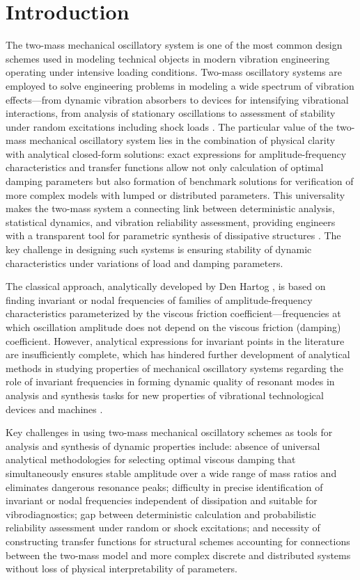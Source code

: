 \documentclass[12pt, a4paper]{article}
\begin{document}
	\section*{Introduction} 
	
	The two-mass mechanical oscillatory system is one of the most common design schemes used in modeling technical objects in modern vibration engineering operating under intensive loading conditions. Two-mass oscillatory systems are employed to solve engineering problems in modeling a wide spectrum of vibration effects---from dynamic vibration absorbers to devices for intensifying vibrational interactions, from analysis of stationary oscillations to assessment of stability under random excitations including shock loads \cite{Lavendel1981, Timoshenko1974}. The particular value of the two-mass mechanical oscillatory system lies in the combination of physical clarity with analytical closed-form solutions: exact expressions for amplitude-frequency characteristics and transfer functions allow not only calculation of optimal damping parameters but also formation of benchmark solutions for verification of more complex models with lumped or distributed parameters. This universality makes the two-mass system a connecting link between deterministic analysis, statistical dynamics, and vibration reliability assessment, providing engineers with a transparent tool for parametric synthesis of dissipative structures \cite{Balakhin2008}. The key challenge in designing such systems is ensuring stability of dynamic characteristics under variations of load and damping parameters.
	
	The classical approach, analytically developed by Den Hartog \cite{DenHartog1956}, is based on finding invariant or nodal frequencies of families of amplitude-frequency characteristics parameterized by the viscous friction coefficient---frequencies at which oscillation amplitude does not depend on the viscous friction (damping) coefficient. However, analytical expressions for invariant points in the literature are insufficiently complete, which has hindered further development of analytical methods in studying properties of mechanical oscillatory systems regarding the role of invariant frequencies in forming dynamic quality of resonant modes in analysis and synthesis tasks for new properties of vibrational technological devices and machines \cite{Kryukov1967, Panovko2020}. 
	
	Key challenges in using two-mass mechanical oscillatory schemes as tools for analysis and synthesis of dynamic properties include: absence of universal analytical methodologies for selecting optimal viscous damping that simultaneously ensures stable amplitude over a wide range of mass ratios and eliminates dangerous resonance peaks; difficulty in precise identification of invariant or nodal frequencies independent of dissipation and suitable for vibrodiagnostics; gap between deterministic calculation and probabilistic reliability assessment under random or shock excitations; and necessity of constructing transfer functions for structural schemes accounting for connections between the two-mass model and more complex discrete and distributed systems without loss of physical interpretability of parameters.
	
\end{document}
